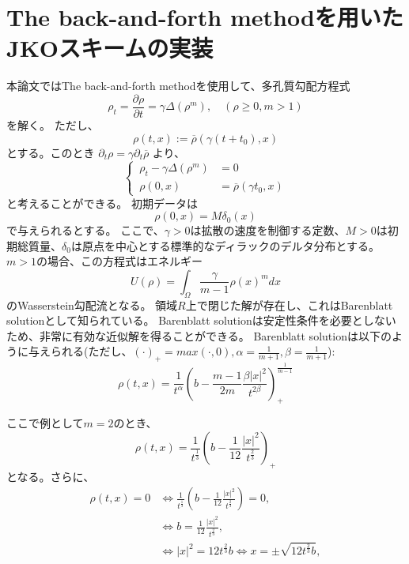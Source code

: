 \section{The back-and-forth methodを用いたJKOスキームの実装}
\label{sect:algorithm}
本論文ではThe back-and-forth methodを使用して、多孔質勾配方程式
\[
    \rho_t = \frac{{\partial \rho}}{{\partial t}} = \gamma\Delta (\rho^m), \quad (\rho \geq 0, m > 1)
\]
を解く。
ただし、
\[
    \rho(t, x) := \overline{\rho}(\gamma(t+t_0), x) 
\]
とする。このとき
$
    \partial_t\rho = \gamma\partial_t\overline{\rho} 
$
より、
\begin{equation}
    \left\{ \,
    \begin{aligned}
        \rho_t - \gamma\Delta(\rho^m) & = 0 \\
        \rho(0, x) & = \overline{\rho}(\gamma t_0, x)
    \end{aligned}
    \right.
\end{equation}
と考えることができる。
初期データは
\[
    \rho(0,x) = M\delta_0(x)
\]
で与えられるとする。
ここで、\(\gamma > 0\)は拡散の速度を制御する定数、\(M > 0\)は初期総質量、\(\delta_0\)は原点を中心とする標準的なディラックのデルタ分布とする。
\(m > 1\)の場合、この方程式はエネルギー
\[
    U(\rho) = \int_\Omega \frac{\gamma}{m - 1}\rho(x)^m dx 
\]
のWasserstein勾配流となる。
領域\(R\)上で閉じた解が存在し、これはBarenblatt solutionとして知られている。
Barenblatt solutionは安定性条件を必要としないため、非常に有効な近似解を得ることができる。
Barenblatt solutionは以下のように与えられる(ただし、$(\cdot)_+ = max(\cdot, 0), \alpha = \frac{1}{m + 1}, \beta = \frac{1}{m + 1}$):
\begin{equation}
    \label{eq:barenblatt}
    \rho(t,x)= \frac{1}{t^\alpha}\left(b - \frac{m - 1}{2m}\frac{\beta |x|^2}{t^{2\beta}} \right)_+^{\frac{1}{m - 1}}
\end{equation}

ここで例として$m = 2$のとき、
\begin{equation}
    \label{eq:barenblatt:m=2}
    \rho(t,x)= \frac{1}{t^{\frac{1}{3}}}\left(b - \frac{1}{12} \frac{ |x|^2}{t^{\frac{2}{3}}} \right)_+
\end{equation}
となる。さらに、
\begin{align*}
    \rho(t, x) = 0 &\iff \frac{1}{t^{\frac{1}{3}}}\left(b - \frac{1}{12} \frac{ |x|^2}{t^{\frac{2}{3}}} \right) = 0,\\
                    &\iff b = \frac{1}{12}\frac{|x|^2}{t^{\frac{2}{3}}}, \\
                    &\iff |x|^2 = 12t^{\frac{2}{3}}b \iff x = \pm \sqrt{12t^{\frac{2}{3}}b},
\end{align*}



